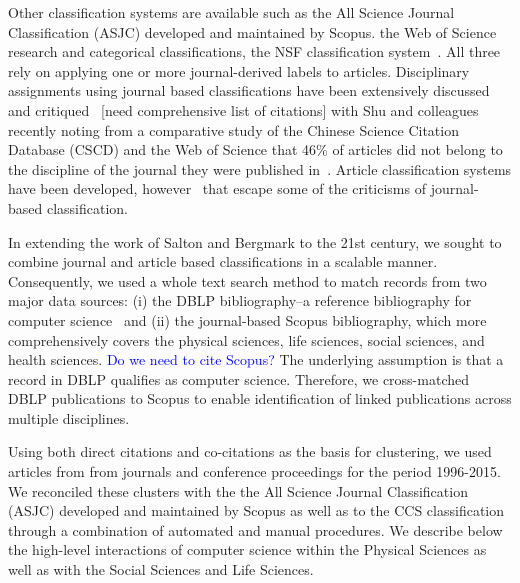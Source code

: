 Other classification systems are available such as the All Science Journal Classification (ASJC) developed and maintained by Scopus. the Web of Science research and categorical classifications, the NSF classification system~\cite{nsf_classification}. All three rely on applying one or more journal-derived labels to articles. Disciplinary assignments using journal based classifications have been extensively discussed and critiqued~\cite{wang_large-scale_2016} [need comprehensive list of citations] with Shu and colleagues recently noting from a comparative study of the Chinese Science Citation Database (CSCD) and the Web of Science that 46\% of articles did not belong to the discipline of the journal they were published in~\cite{shu_comparing_2019}. Article classification systems have been developed, however~\cite{traag_louvain_2019,boyack_classification_2014,waltman_new_2012} that escape some of the criticisms of journal-based classification.

In extending the work of Salton and Bergmark to the 21st century, we sought to combine journal and article based classifications in a scalable manner. Consequently, we used a whole text search method to match records from two major data sources: (i) the DBLP bibliography--a reference bibliography for computer science~\cite{dblp_ref} and  (ii) the journal-based Scopus bibliography, which more comprehensively covers the physical sciences, life sciences, social sciences, and health sciences. 
\textcolor{blue}{Do we need to cite Scopus?}
The underlying assumption is that a record in DBLP qualifies as computer science. Therefore, we cross-matched DBLP publications to Scopus to  enable identification of linked publications across multiple disciplines.

Using both direct citations and co-citations as the basis for clustering, we used articles from from journals and conference proceedings for the period 1996-2015. We reconciled these clusters with the the All Science Journal Classification (ASJC) developed and maintained by Scopus as well as to the CCS classification through a combination of automated and manual procedures. We describe below the high-level interactions of computer science within the Physical Sciences as well as with the Social Sciences and Life Sciences. 

